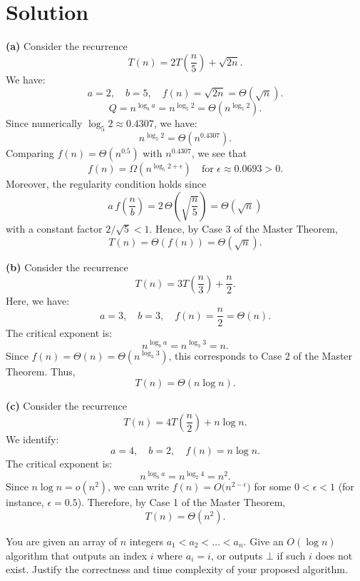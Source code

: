 \documentclass[11pt]{article}
\begin{document}
    \section*{Solution}

    \textbf{(a) } Consider the recurrence 
    \[
    T(n)=2T\left(\frac{n}{5}\right)+\sqrt{2n}.
    \]
    We have:
    \[
    a=2,\quad b=5,\quad f(n)=\sqrt{2n}=\Theta(\sqrt{n}).
    \]
    \[
    Q = n^{\log_b a}=n^{\log_5 2}=\Theta\left(n^{\log_5 2}\right).
    \]
    Since numerically \(\log_5 2\approx 0.4307\), we have:
    \[
    n^{\log_5 2} = \Theta\left(n^{0.4307}\right).
    \]
    Comparing \(f(n)=\Theta\left(n^{0.5}\right)\) with \(n^{0.4307}\), we see that
    \[
    f(n)=\Omega\left(n^{\log_5 2+\epsilon}\right) \quad \text{for } \epsilon\approx 0.0693>0.
    \]
    Moreover, the regularity condition holds since
    \[
    a\, f\left(\frac{n}{b}\right)=2\,\Theta\left(\sqrt{\frac{n}{5}}\right)=\Theta\left(\sqrt{n}\right)
    \]
    with a constant factor \(2/\sqrt{5}<1\). Hence, by Case 3 of the Master Theorem,
    \[
    T(n)=\Theta\left(f(n)\right)=\Theta\left(\sqrt{n}\right).
    \]

    \bigskip

    \textbf{(b) } Consider the recurrence 
    \[
    T(n)=3T\left(\frac{n}{3}\right)+\frac{n}{2}.
    \]
    Here, we have:
    \[
    a=3,\quad b=3,\quad f(n)=\frac{n}{2}=\Theta(n).
    \]
    The critical exponent is:
    \[
    n^{\log_b a}=n^{\log_3 3}=n.
    \]
    Since \(f(n)=\Theta(n)=\Theta\left(n^{\log_3 3}\right)\), this corresponds to Case 2 of the Master Theorem. Thus,
    \[
    T(n)=\Theta(n\log n).
    \]

    \bigskip

    \textbf{(c) } Consider the recurrence 
    \[
    T(n)=4T\left(\frac{n}{2}\right)+n\log n.
    \]
    We identify:
    \[
    a=4,\quad b=2,\quad f(n)=n\log n.
    \]
    The critical exponent is:
    \[
    n^{\log_b a}=n^{\log_2 4}=n^2.
    \]
    Since \(n\log n = o(n^2)\), we can write \(f(n)=O\big(n^{2-\epsilon}\big)\) for some \(0<\epsilon<1\) (for instance, \(\epsilon=0.5\)). Therefore, by Case 1 of the Master Theorem,
    \[
    T(n)=\Theta(n^2).
    \]
    \newpage
    
    \begin{tcolorbox}[title={Problem 2 (Array Search, 30 pts)}]
        You are given an array of $n$ integers $a_1 < a_2 < \dots < a_n$. Give an $O(\log n)$ algorithm that outputs an index $i$ where $a_i = i$, or outputs $\bot$ if such $i$ does not exist. Justify the correctness and time complexity of your proposed algorithm.
    \end{tcolorbox}
    
\end{document}
